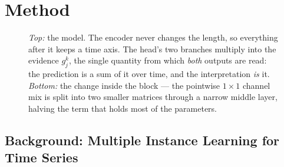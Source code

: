%

\section{Method}
\label{sec:method}

\begin{figure}[t]
  \centering
  \resizebox{\textwidth}{!}{}
  \caption{\emph{Top:} the model. The encoder never changes the length, so everything after it keeps a
  time axis. The head's two branches multiply into the evidence $g_j^k$, the single quantity from
  which \emph{both} outputs are read: the prediction is a sum of it over time, and the interpretation
  \emph{is} it. \emph{Bottom:} the change inside the block --- the pointwise $1\times1$ channel mix is
  split into two smaller matrices through a narrow middle layer, halving the term that holds most of
  the parameters.}
  \label{fig:arch}
\end{figure}

\subsection{Background: Multiple Instance Learning for Time Series}
\label{sec:method:mil}

